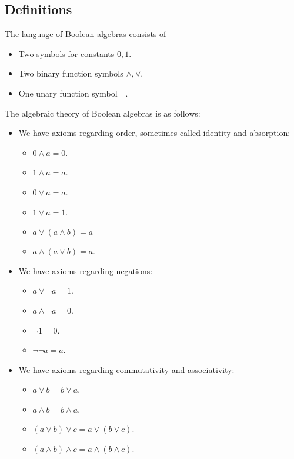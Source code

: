 \documentclass{../util/zariski-small}
\begin{document}
\subsection{Definitions}
\begin{definition}
  The language of Boolean algebras consists of
  \begin{itemize}
    \item Two symbols for constants $0,1$. 
    \item Two binary function symbols $\wedge, \vee$.
    \item One unary function symbol $\neg$. 
  \end{itemize}
\end{definition}
\begin{definition}
  The algebraic theory of Boolean algebras is as follows:
  \begin{itemize}
    \item We have axioms regarding order, sometimes called identity and absorption:
    \begin{itemize}
      \item $0 \wedge a = 0$. 
      \item $1 \wedge a = a$. 
      \item $0 \vee a = a$. 
      \item $1 \vee a = 1$. 
      \item $a \vee (a \wedge b) = a$
      \item $a \wedge (a \vee b) = a$. 
    \end{itemize}
    \item We have axioms regarding negations:
      \begin{itemize}
        \item $a \vee \neg a = 1$. 
        \item $a \wedge \neg a = 0$. 
        \item $\neg 1 = 0$. 
        \item $\neg \neg a = a$. 
      \end{itemize}
    \item We have axioms regarding commutativity and associativity:
      \begin{itemize}
        \item $a \vee b = b \vee a$. 
        \item $a \wedge b = b \wedge a$. 
        \item $(a \vee b) \vee c = a \vee (b \vee c)$. 
        \item $(a \wedge b) \wedge c = a \wedge (b \wedge c)$. 

\end{itemize}
\end{itemize}
\end{definition}
\end{document}
